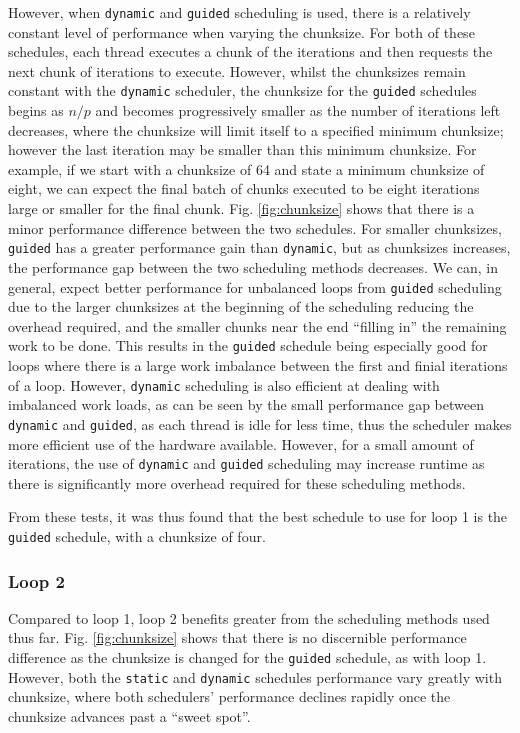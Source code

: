 \documentclass[11pt, a4paper]{article}
\begin{document}
				However, when \texttt{dynamic} and \texttt{guided} scheduling is used, there is a relatively constant level of performance when varying the chunksize. For both of these schedules, each thread executes a chunk of the iterations and then requests the next chunk of iterations to execute. However, whilst the chunksizes remain constant with the \texttt{dynamic} scheduler, the chunksize for the \texttt{guided} schedules begins as $n/p$ and becomes progressively smaller as the number of iterations left decreases, where the chunksize will limit itself to a specified minimum chunksize; however the last iteration may be smaller than this minimum chunksize. For example, if we start with a chunksize of 64 and state a minimum chunksize of eight, we can expect the final batch of chunks executed to be eight iterations large or smaller for the final chunk. Fig. \ref{fig:chunksize} shows that there is a minor performance difference between the two schedules. For smaller chunksizes, \texttt{guided} has a greater performance gain than \texttt{dynamic}, but as chunksizes increases, the performance gap between the two scheduling methods decreases. We can, in general, expect better performance for unbalanced loops from \texttt{guided} scheduling due to the larger chunksizes at the beginning of the scheduling reducing the overhead required, and the smaller chunks near the end ``filling in'' the remaining work to be done. This results in the \texttt{guided} schedule being especially good for loops where there is a large work imbalance between the first and finial iterations of a loop. However, \texttt{dynamic} scheduling is also efficient at dealing with imbalanced work loads, as can be seen by the small performance gap between \texttt{dynamic} and \texttt{guided}, as each thread is idle for less time, thus the scheduler makes more efficient use of the hardware available. However, for a small amount of iterations, the use of \texttt{dynamic} and \texttt{guided} scheduling may increase runtime as there is significantly more overhead required for these scheduling methods. 
				
				From these tests, it was thus found that the best schedule to use for loop 1 is the \texttt{guided} schedule, with a chunksize of four.

			\subsubsection{Loop 2} \label{sect:loop2_chunks}
				Compared to loop 1, loop 2 benefits greater from the scheduling methods used thus far. Fig. \ref{fig:chunksize} shows that there is no discernible performance difference as the chunksize is changed for the \texttt{guided} schedule, as with loop 1. However,  both the \texttt{static} and \texttt{dynamic} schedules performance vary greatly with chunksize, where both schedulers' performance declines rapidly once the chunksize advances past a ``sweet spot''.
				
\end{document}
